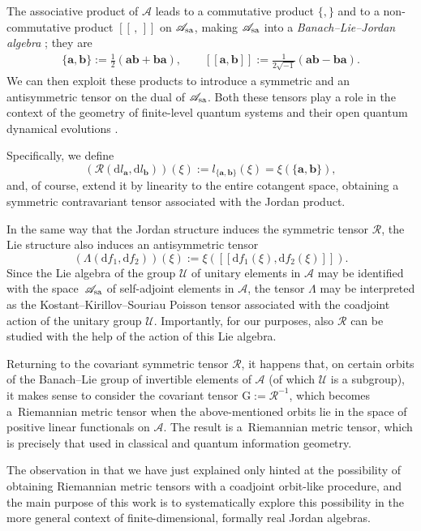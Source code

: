 \documentclass[10pt,a4paper]{amsart}
\numberwithin{equation}{section}
\newcommand{\appa}{\mathscr{A}}
\newcommand{\appas}{\mathscr{A}_{\rm sa}}
\newcommand{\G}{\mathrm{G}}
\begin{document}
The associative product of $\appa$ leads to a commutative product $\{,\}$ and to a non-commutative product $[[\,,\,]]$ on $\appas$, making $\appa_{\rm sa}$ into a \emph{Banach--Lie--Jordan algebra} \cite{A-S-2001}; they are
\begin{gather*}%
\{\mathbf{a},\mathbf{b}\} := \frac{1}{2} (\mathbf{ab} + \mathbf{ba}), \qquad
[[\mathbf{a},\mathbf{b}]] := \frac{1}{2\sqrt{-1}} (\mathbf{ab} - \mathbf{ba}).
\end{gather*}
We can then exploit these products to introduce a symmetric and an antisymmetric tensor on the dual of $\appas$.
Both these tensors play a role in the context of the geometry of finite-level quantum systems and their open quantum dynamical evolutions \cite{C-C-I-M-V-2019, C-DC-I-L-M-2017}.

Specifically, we define
\[
\left(\mathcal{R}(\mathrm{d}l_{\mathbf{a}},\mathrm{d}l_{\mathbf{b}})\right)(\xi) := l_{\{\mathbf{a},\mathbf{b}\}}(\xi) = \xi(\{\mathbf{a},\mathbf{b}\}),
\]
and, of course, extend it by linearity to the entire cotangent space, obtaining a symmetric contravariant tensor associated with the Jordan product.

In the same way that the Jordan structure induces the symmetric tensor $\mathcal{R}$, the Lie structure also induces an antisymmetric tensor
\[
\left(\Lambda(\mathrm{d}f_{1},\mathrm{d}f_{2})\right)(\xi) := \xi\left([[\mathrm{d}f_{1}(\xi), \mathrm{d}f_{2}(\xi)]]\right).
\]
Since the Lie algebra of the group $\mathscr{U}$ of unitary elements in $\appa$ may be identified with the space~$\appas$ of self-adjoint elements in $\appa$, the tensor $\Lambda$ may be interpreted as the Kostant--Kirillov--Souriau Poisson tensor associated with the coadjoint action of the unitary group $\mathscr{U}$.
Importantly, for our purposes, also $\mathcal{R}$ can be studied with the help of the action of this Lie algebra.

Returning to the covariant symmetric tensor $\mathcal{R}$, it happens that, on certain orbits of the Banach--Lie group of invertible elements of $\appa$ (of which $\mathscr{U}$ is a subgroup), it makes sense to consider the covariant tensor $\G := \mathcal{R}^{-1}$, which becomes a~Riemannian metric tensor when the above-mentioned orbits lie in the space of positive linear functionals on $\appa$. The result is a~Riemannian metric tensor, which is precisely that used in classical and quantum information geometry.

The observation in \cite{C-J-S-2020} that we have just explained only hinted at the possibility of obtaining Riemannian metric tensors with a coadjoint orbit-like procedure, and the main purpose of this work is to systematically explore this possibility in the more general context of finite-dimensional, formally real Jordan algebras.
\end{document}

